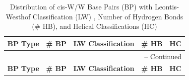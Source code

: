 \begin{center}
\begin{longtable}{c|c|c|c|c}
\caption{Distribution of cis-W/W Base Pairs (BP) with Leontis-Westhof
  Classification (LW) , Number of Hydrogen Bonds (\# HB), and Helical Classifications (HC)}
\label{tab:allWC_LW_hb_hel}\\ 
\bf{BP Type} & \bf{\# BP} & \bf{LW Classification} &
\bf{\# HB} & \bf{HC}  \\  \hline \hline
\endfirsthead

\multicolumn{5}{r}{{\tablename} \thetable{} -- Continued} \\
\bf{BP Type} & \bf{\# BP} & \bf{LW Classification} &
\bf{\# HB} & \bf{HC} \\  \hline \hline

\endhead


\end{longtable}
\end{center}
